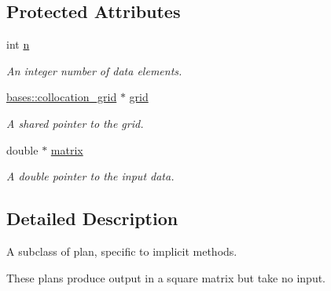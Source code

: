 \subsection*{Protected Attributes}
\begin{DoxyCompactItemize}
\item 
\hypertarget{classbases_1_1implicit__plan_a43fa2adfff9e68a66a23cf03b027a32d}{int \hyperlink{classbases_1_1implicit__plan_a43fa2adfff9e68a66a23cf03b027a32d}{n}}\label{classbases_1_1implicit__plan_a43fa2adfff9e68a66a23cf03b027a32d}

\begin{DoxyCompactList}\small\item\em An integer number of data elements. \end{DoxyCompactList}\item 
\hypertarget{classbases_1_1implicit__plan_a23a0aa32f42b2ba03ef47ba60567522b}{\hyperlink{classbases_1_1collocation__grid}{bases\-::collocation\-\_\-grid} $\ast$ \hyperlink{classbases_1_1implicit__plan_a23a0aa32f42b2ba03ef47ba60567522b}{grid}}\label{classbases_1_1implicit__plan_a23a0aa32f42b2ba03ef47ba60567522b}

\begin{DoxyCompactList}\small\item\em A shared pointer to the grid. \end{DoxyCompactList}\item 
\hypertarget{classbases_1_1implicit__plan_af9d3db062039649e63a7fe1f83a9d155}{double $\ast$ \hyperlink{classbases_1_1implicit__plan_af9d3db062039649e63a7fe1f83a9d155}{matrix}}\label{classbases_1_1implicit__plan_af9d3db062039649e63a7fe1f83a9d155}

\begin{DoxyCompactList}\small\item\em A double pointer to the input data. \end{DoxyCompactList}\end{DoxyCompactItemize}


\subsection{Detailed Description}
A subclass of plan, specific to implicit methods. 



 These plans produce output in a square matrix but take no input. 

